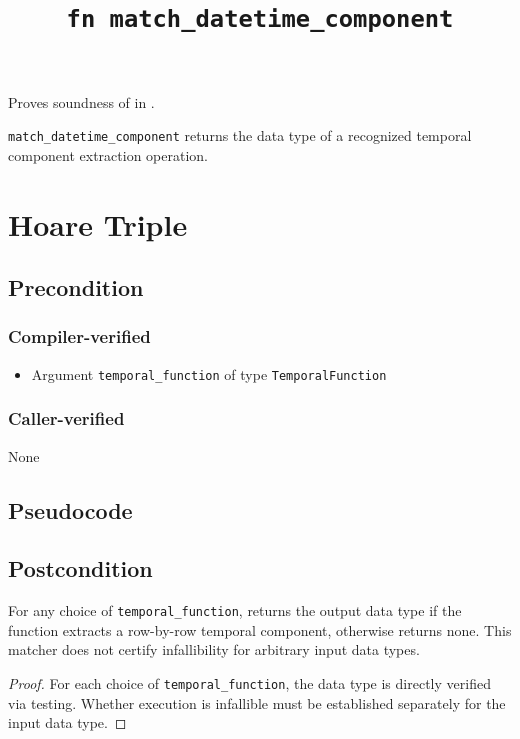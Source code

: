 \documentclass{article}
\title{\texttt{fn match\_datetime\_component}}
\author{\MichaelShoemateAuthor}
\date{}
\begin{document}
\maketitle

\contrib
Proves soundness of  in .

\texttt{match\_datetime\_component} returns the data type of a recognized temporal component extraction operation.

\section{Hoare Triple}
\subsection*{Precondition}
\subsubsection*{Compiler-verified}
\begin{itemize}
    \item Argument \texttt{temporal\_function} of type \texttt{TemporalFunction}
\end{itemize}

\subsubsection*{Caller-verified}
None

\subsection*{Pseudocode}


\subsection*{Postcondition}
\begin{theorem}
    For any choice of \texttt{temporal\_function},
    returns the output data type if the function extracts a row-by-row temporal component,
    otherwise returns none. This matcher does not certify infallibility for arbitrary input data types.
\end{theorem}

\begin{proof}
    For each choice of \texttt{temporal\_function},
    the data type is directly verified via testing.
    Whether execution is infallible must be established separately for the input data type.
\end{proof}
\end{document}
